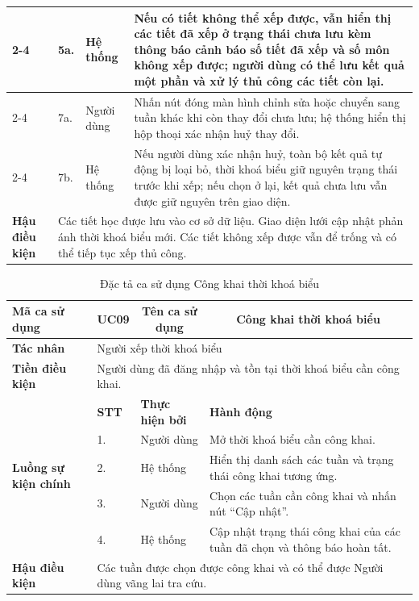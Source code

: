\documentclass[../DoAn.tex]{subfiles}
\begin{document}
\begin{longtable}{|p{2.8cm}|p{1cm}|p{2.8cm}|p{6.3cm}|}
\cline{2-4}
& 5a. & Hệ thống & Nếu có tiết không thể xếp được, vẫn hiển thị các tiết đã xếp ở trạng thái chưa lưu kèm thông báo cảnh báo số tiết đã xếp và số môn không xếp được; người dùng có thể lưu kết quả một phần và xử lý thủ công các tiết còn lại. \\
\cline{2-4}
& 7a. & Người dùng & Nhấn nút đóng màn hình chỉnh sửa hoặc chuyển sang tuần khác khi còn thay đổi chưa lưu; hệ thống hiển thị hộp thoại xác nhận huỷ thay đổi. \\
\cline{2-4}
& 7b. & Hệ thống & Nếu người dùng xác nhận huỷ, toàn bộ kết quả tự động bị loại bỏ, thời khoá biểu giữ nguyên trạng thái trước khi xếp; nếu chọn ở lại, kết quả chưa lưu vẫn được giữ nguyên trên giao diện. \\
\hline
\multicolumn{1}{|l|}{\textbf{Hậu điều kiện}} & \multicolumn{3}{p{10.5cm}|}{Các tiết học được lưu vào cơ sở dữ liệu. Giao diện lưới cập nhật phản ánh thời khoá biểu mới. Các tiết không xếp được vẫn để trống và có thể tiếp tục xếp thủ công.} \\
\hline
\end{longtable}


\begin{longtable}{|p{2.8cm}|p{1cm}|p{2.8cm}|p{6.3cm}|}
\caption{Đặc tả ca sử dụng Công khai thời khoá biểu}
\label{tab:app_uc_cong_khai_tkb} \\
\hline
\multicolumn{1}{|l|}{\textbf{Mã ca sử dụng}} & \multicolumn{1}{c|}{UC09} &
\multicolumn{1}{c|}{\textbf{Tên ca sử dụng}} & \multicolumn{1}{c|}{Công khai thời khoá biểu} \\
\hline
\multicolumn{1}{|l|}{\textbf{Tác nhân}} & \multicolumn{3}{l|}{Người xếp thời khoá biểu} \\
\hline
\multicolumn{1}{|l|}{\textbf{Tiền điều kiện}} & \multicolumn{3}{p{10.5cm}|}{Người dùng đã đăng nhập và tồn tại thời khoá biểu cần công khai.} \\
\hline
\multirow{5}{2.8cm}{\textbf{Luồng sự kiện chính}} & \textbf{STT} & \textbf{Thực hiện bởi} & \textbf{Hành động} \\
\cline{2-4}
& 1. & Người dùng & Mở thời khoá biểu cần công khai. \\
\cline{2-4}
& 2. & Hệ thống & Hiển thị danh sách các tuần và trạng thái công khai tương ứng. \\
\cline{2-4}
& 3. & Người dùng & Chọn các tuần cần công khai và nhấn nút ``Cập nhật''. \\
\cline{2-4}
& 4. & Hệ thống & Cập nhật trạng thái công khai của các tuần đã chọn và thông báo hoàn tất. \\
\hline
\multicolumn{1}{|l|}{\textbf{Hậu điều kiện}} & \multicolumn{3}{p{10.5cm}|}{Các tuần được chọn được công khai và có thể được Người dùng vãng lai tra cứu.} \\
\hline
\end{longtable}
\end{document}
